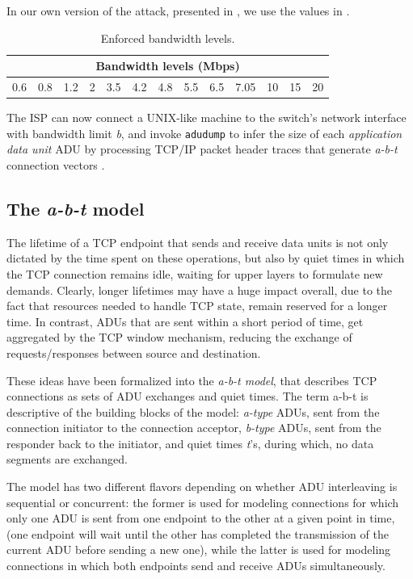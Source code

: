 In our own version of the attack, presented in , we use
the values in . 

\begin{table}[htb]
  \centering
  \begin{tabular}{|c|c|c|c|c|c|c|c|c|c|c|c|c|}
    \hline
    \multicolumn{13}{|c|}{\textbf{Bandwidth levels (Mbps)}} \\
    \hline
    0.6 & 0.8 & 1.2 & 2 & 3.5 & 4.2 & 4.8 & 5.5 & 6.5 & 7.05 & 10 & 15 & 20 \\ 
    \hline
  \end{tabular}
  \caption{Enforced bandwidth levels.}
  \label{tab:bandwidths}
\end{table}

The ISP can now connect a UNIX-like machine to the switch's network interface
with bandwidth limit \emph{b}, and invoke \texttt{adudump} to infer the size of
each \emph{application data unit} ADU by processing TCP/IP packet header
traces that generate \emph{a-b-t} connection vectors \cite{hernandez}.

\subsection{The \emph{a-b-t} model}

The lifetime of a TCP endpoint that sends and receive data units is not only
dictated by the time spent on these operations, but also by quiet times in
which the TCP connection remains idle, waiting for upper layers to formulate
new demands. Clearly, longer lifetimes may have a huge impact overall, due to
the fact that resources needed to handle TCP state, remain reserved for a
longer time. In contrast, ADUs that are sent within a short period of time, get
aggregated by the TCP window mechanism, reducing the exchange of
requests/responses between source and destination.

These ideas have been formalized into the \emph{a-b-t model}, that describes
TCP connections as sets of ADU exchanges and quiet times. The term a-b-t is
descriptive of the building blocks of the model: \emph{a-type} ADUs, sent from
the connection initiator to the connection acceptor, \emph{b-type} ADUs, sent
from the responder back to the initiator, and quiet times \emph{t}'s, during
which, no data segments are exchanged.

The model has two different flavors depending on whether ADU interleaving is
sequential or concurrent: the former is used for modeling connections for which
only one ADU is sent from one endpoint to the other at a given point in time,
(one endpoint will wait until the other has completed the transmission of the
current ADU before sending a new one), while the latter is used for modeling
connections in which both endpoints send and receive ADUs simultaneously.

